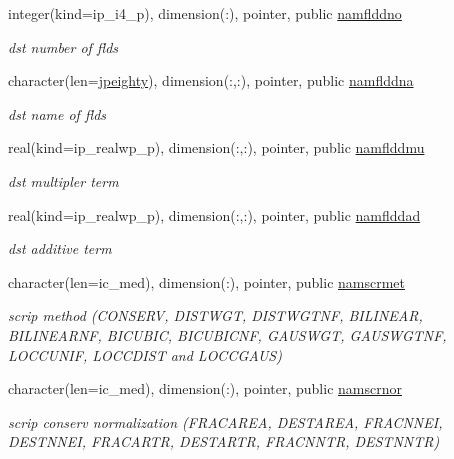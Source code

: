 \begin{DoxyCompactItemize}
integer(kind=ip\+\_\+i4\+\_\+p), dimension(\+:), pointer, public \hyperlink{namespacemod__oasis__namcouple_a0bc8fb08bfa426cc3da584e401b45328}{namflddno}
\begin{DoxyCompactList}\small\item\em dst number of flds \end{DoxyCompactList}\item 
character(len=\hyperlink{namespacemod__oasis__namcouple_a4fb10ad6e864dcbe34c4a8b02204a523}{jpeighty}), dimension(\+:,\+:), pointer, public \hyperlink{namespacemod__oasis__namcouple_af064ea6bf295846a3f2f8a8b3ab66a66}{namflddna}
\begin{DoxyCompactList}\small\item\em dst name of flds \end{DoxyCompactList}\item 
real(kind=ip\+\_\+realwp\+\_\+p), dimension(\+:,\+:), pointer, public \hyperlink{namespacemod__oasis__namcouple_adff0b79053f9cad9717a5ce3c09136e6}{namflddmu}
\begin{DoxyCompactList}\small\item\em dst multipler term \end{DoxyCompactList}\item 
real(kind=ip\+\_\+realwp\+\_\+p), dimension(\+:,\+:), pointer, public \hyperlink{namespacemod__oasis__namcouple_a6500fb8d6da6ed3cf4ec148f38efa704}{namflddad}
\begin{DoxyCompactList}\small\item\em dst additive term \end{DoxyCompactList}\item 
character(len=ic\+\_\+med), dimension(\+:), pointer, public \hyperlink{namespacemod__oasis__namcouple_a51c19e0892a72acc3dca2adb046ed175}{namscrmet}
\begin{DoxyCompactList}\small\item\em scrip method (C\+O\+N\+S\+E\+RV, D\+I\+S\+T\+W\+GT, D\+I\+S\+T\+W\+G\+T\+NF, B\+I\+L\+I\+N\+E\+AR, B\+I\+L\+I\+N\+E\+A\+R\+NF, B\+I\+C\+U\+B\+IC, B\+I\+C\+U\+B\+I\+C\+NF, G\+A\+U\+S\+W\+GT, G\+A\+U\+S\+W\+G\+T\+NF, L\+O\+C\+C\+U\+N\+IF, L\+O\+C\+C\+D\+I\+ST and L\+O\+C\+C\+G\+A\+US) \end{DoxyCompactList}\item 
character(len=ic\+\_\+med), dimension(\+:), pointer, public \hyperlink{namespacemod__oasis__namcouple_a392f40531007d5dcc084e6ad4a393fd7}{namscrnor}
\begin{DoxyCompactList}\small\item\em scrip conserv normalization (F\+R\+A\+C\+A\+R\+EA, D\+E\+S\+T\+A\+R\+EA, F\+R\+A\+C\+N\+N\+EI, D\+E\+S\+T\+N\+N\+EI, F\+R\+A\+C\+A\+R\+TR, D\+E\+S\+T\+A\+R\+TR, F\+R\+A\+C\+N\+N\+TR, D\+E\+S\+T\+N\+N\+TR) \end{DoxyCompactList}\item 

\end{DoxyCompactItemize}
